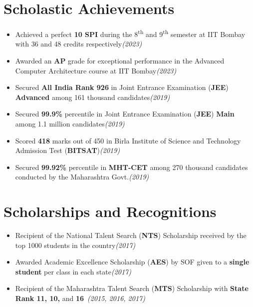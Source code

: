 \documentclass[10pt,a4paper,sans]{moderncv}        %
\newcommand{\rhsmall}[1]{\hfill{\footnotesize{\textsl{(#1)}}}}
\begin{document}
\section{Scholastic Achievements}
\vspace{0.2em}
\begin{itemize}
	\item Achieved a perfect \textbf{10 SPI} during the 8\textsuperscript{th} and 9\textsuperscript{th} semester at IIT Bombay with 36 and 48 credits respectively\rhsmall{2023}%
	\item Awarded an \textbf{AP} grade for exceptional performance in the Advanced Computer Architecture course at IIT Bombay\rhsmall{2023}
	\item Secured \textbf{All India Rank 926} in Joint Entrance Examination (\textbf{JEE}) \textbf{Advanced} among 161 thousand candidates\rhsmall{2019}
	\item Secured \textbf{99.9\%} percentile in Joint Entrance Examination (\textbf{JEE}) \textbf{Main} among 1.1 million candidates\rhsmall{2019}
	\item Scored \textbf{418} marks out of 450 in Birla Institute of Science and Technology Admission Test (\textbf{BITSAT})\rhsmall{2019}
	\item Secured \textbf{99.92\%} percentile in \textbf{MHT-CET} among 270 thousand candidates conducted by the Maharashtra Govt.\rhsmall{2019} 
\end{itemize}
\section{Scholarships and Recognitions}
\vspace{0.2em}
\begin{itemize}
	\item Recipient of the National Talent Search (\textbf{NTS}) Scholarship received by the top 1000 students in the country\rhsmall{2017}
	\item Awarded Academic Excellence Scholarship (\textbf{AES}) by SOF given to a \textbf{single  student} per class in each state\rhsmall{2017}%
	\item Recipient of the Maharashtra Talent Search (\textbf{MTS}) Scholarship  with \textbf{State Rank 11, 10,} and \textbf{16}\ \rhsmall{2015, 2016, 2017}%
\end{itemize}
\end{document}
